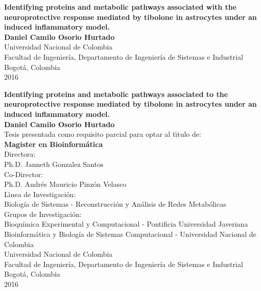 \begin{center}
\begin{figure}
\centering%
%
\end{figure}
\thispagestyle{empty} \vspace*{2.0cm} \textbf{\huge
Identifying proteins and metabolic pathways associated with the neuroprotective response mediated by tibolone in astrocytes under an induced inflammatory model.}\\[3.0cm]
\Large\textbf{Daniel Camilo Osorio Hurtado}\\[6.0cm]
\small Universidad Nacional de Colombia\\
Facultad de Ingeniería, Departamento de Ingeniería de Sistemas e Industrial\\
Bogotá, Colombia\\
2016\\
\end{center}

\newpage{\pagestyle{empty}\cleardoublepage}

\newpage
\begin{center}
\thispagestyle{empty} \vspace*{0cm} \textbf{\huge
Identifying proteins and metabolic pathways associated to the neuroprotective response mediated by tibolone in astrocytes under an induced inflammatory model.}\\[2.0cm]
\Large\textbf{Daniel Camilo Osorio Hurtado}\\[2.0cm]
\small Tesis presentada como requisito parcial para optar al
t\'{\i}tulo de:\\
\textbf{Magister en Bioinformática}\\[1.5cm]
Directora:\\
Ph.D. Janneth Gonzalez Santos\\[0.7cm]
Co-Director:\\
Ph.D. Andrés Mauricio Pinzón Velasco\\[1.5cm]
L\'{\i}nea de Investigaci\'{o}n:\\
Biolog\'ia de Sistemas - Reconstrucción y Análisis de Redes Metab\'olicas \\
Grupos de Investigaci\'{o}n:\\
Bioquímica Experimental y Computacional - Pontificia Universidad Javeriana \\
Bioinformática y Biología de Sistemas Computacional - Universidad Nacional de Colombia\\[1.7cm]
Universidad Nacional de Colombia\\
Facultad de Ingeniería, Departamento de Ingeniería de Sistemas e Industrial\\
Bogotá, Colombia\\
2016
\end{center}
\newpage{\pagestyle{empty}\cleardoublepage}
